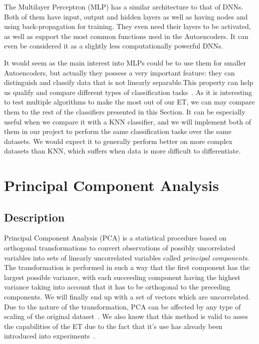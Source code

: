 The Multilayer Perceptron (MLP) has a similar architecture to that of DNNs. Both of them have input, output and hidden layers as well as having nodes and using back-propagation for training. They even need their layers to be activated, as well as support the most common functions used in the Autoencoders. It can even be considered it as a slightly less computationally powerful DNNs. \par

It would seem as the main interest into MLPs could be to use them for smaller Autoencoders, but actually they possess a very important feature: they  can distinguish and classify data that is not linearly separable.This property can help us qualify and compare different types of classification tasks~\cite{MLP_classifier}. As it is interesting to test multiple algorithms to make the most out of our ET, we can may compare them  to the rest of the classifiers presented in this Section. It can be especially useful when we compare it with a  KNN classifier, and we will implement both of them in our project to perform the same classification tasks over the same datasets. We would expect it to generally perform better on more complex datasets than KNN, which suffers when data is more difficult to differentiate. \par

\section{Principal Component Analysis}
\label{tools:pca}

\subsection{Description}
Principal Component Analysis (PCA) is a statistical procedure based on orthogonal transformations to convert observations of possibly uncorrelated variables into sets of linearly uncorrelated variables called \emph{principal components}. The transformation is performed in such a way that the first component has the largest possible variance, with each succeeding component having the highest variance taking into account that it has to be orthogonal to the preceding components. We will finally end up with a set of vectors which are uncorrelated. Due to the nature of the transformation, PCA can be affected by any type of scaling of the original dataset~\cite{mur:12}. 
%
We also know that this method is valid to asses the capabilities of the ET due to the fact that it's use has already been introduced into experiments~\cite{val:pel:18c}.


